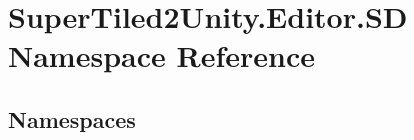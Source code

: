 \hypertarget{namespace_super_tiled2_unity_1_1_editor_1_1_s_d}{}\section{Super\+Tiled2\+Unity.\+Editor.\+SD Namespace Reference}
\label{namespace_super_tiled2_unity_1_1_editor_1_1_s_d}
\subsection*{Namespaces}
\begin{DoxyCompactItemize}
\end{DoxyCompactItemize}
